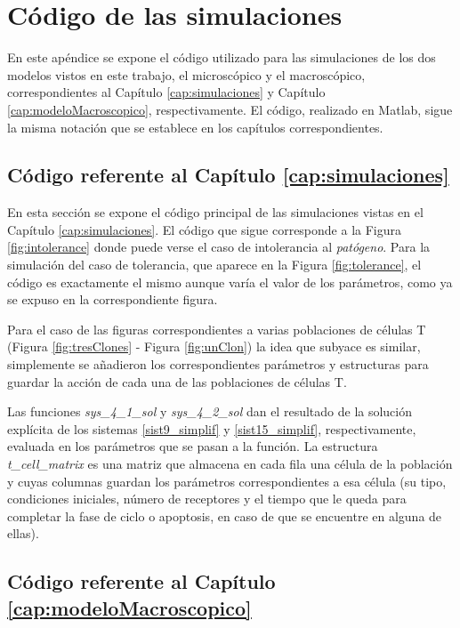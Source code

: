\chapter{Código de las simulaciones}
\label{Appendix:A}

En este apéndice se expone el código utilizado para las simulaciones de los dos modelos vistos en este trabajo, el microscópico y el macroscópico, correspondientes al Capítulo \ref{cap:simulaciones} y Capítulo \ref{cap:modeloMacroscopico}, respectivamente. El código, realizado en Matlab, sigue la misma notación que se establece en los capítulos correspondientes.

\section{Código referente al Capítulo \ref{cap:simulaciones}}
\label{sec:codigoMicro}
En esta sección se expone el código principal de las simulaciones vistas en el Capítulo \ref{cap:simulaciones}. El código que sigue corresponde a la Figura \ref{fig:intolerance} donde puede verse el caso de intolerancia al \textit{patógeno}. Para la simulación del caso de tolerancia, que aparece en la Figura \ref{fig:tolerance}, el código es exactamente el mismo aunque varía el valor de los parámetros, como ya se expuso en la correspondiente figura. 

Para el caso de las figuras correspondientes a varias poblaciones de células T (Figura \ref{fig:tresClones} - Figura \ref{fig:unClon}) la idea que subyace es similar, simplemente se añadieron los correspondientes parámetros y estructuras para guardar la acción de cada una de las poblaciones de células T. 

Las funciones \textit{sys\_4\_1\_sol} y \textit{sys\_4\_2\_sol} dan el resultado de la solución explícita de los sistemas \ref{sist9_simplif} y \ref{sist15_simplif}, respectivamente, evaluada en los parámetros que se pasan a la función. La estructura \textit{t\_cell\_matrix} es una matriz que almacena en cada fila una célula de la población y cuyas columnas guardan los parámetros correspondientes a esa célula (su tipo, condiciones iniciales, número de receptores y el tiempo que le queda para completar la fase de ciclo o apoptosis, en caso de que se encuentre en alguna de ellas). 




\section{Código referente al Capítulo \ref{cap:modeloMacroscopico}}
\label{sec:codigoMacro}

